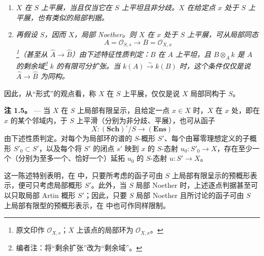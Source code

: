 \begin{enumerate}\item[(i)]\textit{\(X\) 在 \(S\) 上平展，当且仅当它在 \(S\) 上平坦且非分歧。\(X\) 在给定点 \(x\) 处于 \(S\) 上平展，也有类似的局部判据。}

\item[(ii)]\textit{再假设 \(S\)，因而 \(X\)，局部 Noether。则 \(X\) 在 \(x\) 处于 \(S\) 上平展，可从局部同态 \[
  A=\mathscr O_{S,s}\longrightarrow B=\mathscr O_{X,x}
\]\footnote{原文印作 \(\mathscr O_{X,s}\)；\(X\) 上该点的局部环为 \(\mathscr O_{X,x}\)。}（甚至从 \(\widehat A\to\widehat B\)）由下述特征性质判定：\(B\) 在 \(A\) 上平坦，且 \(B\otimes_A k\) 是 \(A\) 的剩余域\footnote{编者注：将“剩余扩张”改为“剩余域”。} \(k\) 的有限可分扩张。当 \(k(A)\xrightarrow{\sim}k(B)\) 时，这个条件仅仅是说 \(\widehat A\to\widehat B\) 为同构。}\end{enumerate}

因此，从“形式”的观点看，称 \(X\) 在 \(S\) 上平展，仅仅是说 \(X\) 局部同构于 \(S\)。

\medskip\noindent{}\textbf{注 1.5。} --- 当 \(X\) 在 \(S\) 上局部有限呈示，且给定一点 \(x\in X\) 时，\(X\) 在 \(x\) 处，即在 \(x\) 的某个邻域内，于 \(S\) 上平滑（分别为非分歧、平展），也可从函子 \[
  X:(\mathbf{Sch})^\circ/S\longrightarrow(\mathbf{Ens})
\] 由下述性质判定。对每个为局部环的谱的 \(S\)-概形 \(S'\)、每个由幂零理想定义的子概形 \(S'_0\subset S'\)，以及每个将 \(S'\) 的闭点 \(s'\) 映到 \(x\) 的 \(S\)-态射 \(u_0:S'_0\to X\)，存在至少一个（分别为至多一个、恰好一个）延拓 \(u_0\) 的 \(S\)-态射 \(u:S'\to X\)。

这一陈述特别表明，在  中，只要所考虑的函子可由 \(S\) 上局部有限呈示的预概形表示，便可只考虑局部概形 \(S'\)。此外，当 \(S\) 局部 Noether 时，上述逐点判据甚至可以只取局部 Artin 概形 \(S'\)；因此，只要 \(S\) 局部 Noether 且所讨论的函子可由 \(S\) 上局部有限型的预概形表示，在  中也可作同样限制。


